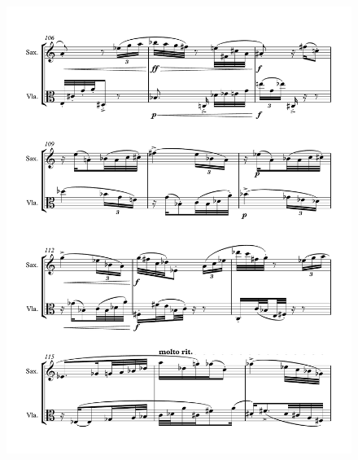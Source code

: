 \begin{figure}[htbp]
    \centering
	\includegraphics[width=6.5in]{figures/Sax_Viola_31.pdf}
\end{figure}

